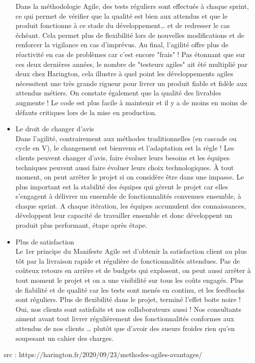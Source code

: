 \documentclass{book}
\begin{document}
\begin{itemize}
  Dans la méthodologie Agile, des tests réguliers sont effectués à chaque sprint, ce qui permet de vérifier que la qualité est bien aux attendus et que le produit fonctionne à ce stade du développement… et de redresser le cas échéant. Cela permet plus de flexibilité lors de nouvelles modifications et de renforcer la vigilance en cas d’imprévus. Au final, l’agilité offre plus de réactivité en cas de problèmes car c’est encore "frais" ! Pas étonnant que sur ces deux dernières années, le nombre de "testeurs agiles" ait été multiplié par deux chez Harington, cela illustre à quel point les développements agiles nécessitent une très grande rigueur pour livrer un produit fiable et fidèle aux attendus métiers. On constate également que la qualité des livrables augmente ! Le code est plus facile à maintenir et il y a de moins en moins de défauts critiques lors de la mise en production.
  \item Le droit de changer d’avis
  \\ Dans l’agilité, contrairement aux méthodes traditionnelles (en cascade ou cycle en V), le changement est bienvenu et l’adaptation est la règle ! Les clients peuvent changer d’avis, faire évoluer leurs besoins et les équipes techniques peuvent aussi faire évoluer leurs choix technologiques. À tout moment, on peut arrêter le projet si on considère être dans une impasse. Le plus important est la stabilité des équipes qui gèrent le projet car elles s’engagent à délivrer un ensemble de fonctionnalités convenues ensemble, à chaque sprint. A chaque itération, les équipes accumulent des connaissances, développent leur capacité de travailler ensemble et donc développent un produit plus performant, étape après étape.
  \item Plus de satisfaction
  \\ Le 1er principe du Manifeste Agile est d’obtenir la satisfaction client au plus tôt par la livraison rapide et régulière de fonctionnalités attendues. Pas de coûteux retours en arrière et de budgets qui explosent, on peut aussi arrêter à tout moment le projet et on a une visibilité sur tous les coûts engagés. Plus de fiabilité et de qualité car les tests sont menés en continu, et les feedbacks sont réguliers. Plus de flexibilité dans le projet, terminé l’effet boite noire ! Oui, nos clients sont satisfaits et nos collaborateurs aussi ! Nos consultants aiment avant tout livrer régulièrement des fonctionnalités conformes aux attendus de nos clients … plutôt que d’avoir des sueurs froides rien qu’en soupesant un cahier des charges.
\end{itemize}
src : https://harington.fr/2020/09/23/methodes-agiles-avantages/
\newpage
\end{document}
